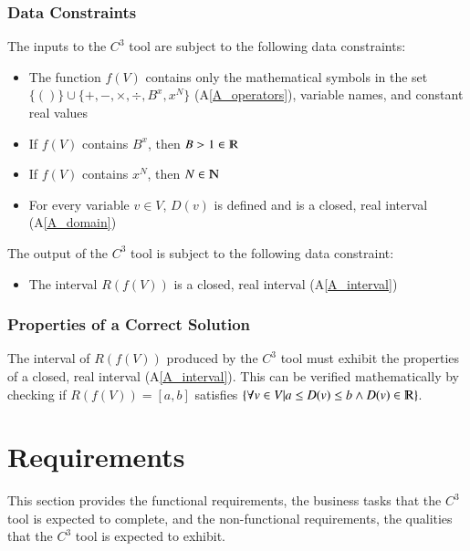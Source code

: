 \documentclass[12pt]{article}
\newcommand{\aref}[1]{A\ref{#1}}
\newcommand{\prognameAbbrv}{$C^{3}$}
\begin{document}
\subsubsection{Data Constraints} \label{sec_DataConstraints}  
The inputs to the \prognameAbbrv{} tool are subject to the following data 
constraints:

\begin{itemize}
	\item The function $f(V)$ contains only the mathematical symbols in 
	the set $\{()\} \cup \{+, -, \times, \div, B^x, x^N \}$ 
	(\aref{A_operators}), variable names, and constant real values
	\item If $f(V)$ contains $B^x$, then $B > 1 \in \varmathbb{R}$
	\item If $f(V)$ contains $x^N$, then $N \in \varmathbb{N}$
	\item For every variable $v \in V$, $D(v)$ is defined and is a closed, real 
	interval (\aref{A_domain})
\end{itemize}

\noindent
The output of the \prognameAbbrv{} tool is subject to the following data 
constraint:

\begin{itemize}
	\item The interval $R(f(V))$ is a closed, real interval (\aref{A_interval})
\end{itemize}

\subsubsection{Properties of a Correct Solution} 
\label{sec_CorrectSolution}

\noindent
The interval of $R(f(V))$ produced by the \prognameAbbrv{} tool must exhibit 
the properties of a closed, real interval (\aref{A_interval}). This can be 
verified mathematically by checking if $R(f(V)) = [a,b]$ satisfies $\{\forall v 
\in V | a \leq D(v) \leq b \wedge D(v) \in \varmathbb{R}\}$.

\newpage

\section{Requirements}
\label{requirements}

This section provides the functional requirements, the business tasks that the
\prognameAbbrv{} tool is expected to complete, and the non-functional 
requirements, the qualities that the \prognameAbbrv{} tool is expected to 
exhibit.
\end{document}
